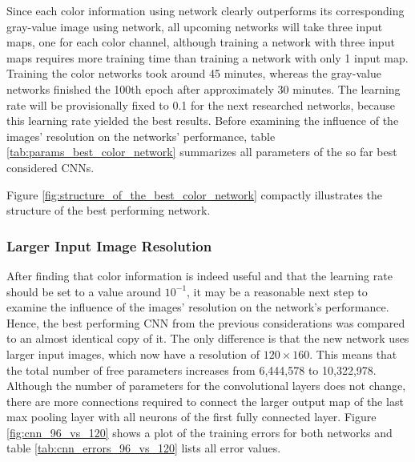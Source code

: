 \documentclass[11pt, a4paper]{article}
\begin{document}

Since each color information using network clearly outperforms its corresponding gray-value image using network, all upcoming networks will take three input maps, one for each color channel, although training a network with three input maps requires more training time than training a network with only 1 input map. Training the color networks took around 45 minutes, whereas the gray-value networks finished the 100th epoch after approximately 30 minutes. The learning rate will be provisionally fixed to 0.1 for the next researched networks, because this learning rate yielded the best results. Before examining the influence of the images' resolution on the networks' performance, table \ref{tab:params_best_color_network} summarizes all parameters of the so far best considered \acp{CNN}.



Figure \ref{fig:structure_of_the_best_color_network} compactly illustrates the structure of the best performing network.



\subsubsection{Larger Input Image Resolution}

After finding that color information is indeed useful and that the learning rate should be set to a value around $10^{-1}$, it may be a reasonable next step to examine the influence of the images' resolution on the network's performance. Hence, the best performing \ac{CNN} from the previous considerations was compared to an almost identical copy of it. The only difference is that the new network uses larger input images, which now have a resolution of $120\times160$. This means that the total number of free parameters increases from 6,444,578 to 10,322,978. Although the number of parameters for the convolutional layers does not change, there are more connections required to connect the larger output map of the last max pooling layer with all neurons of the first fully connected layer. Figure \ref{fig:cnn_96_vs_120} shows a plot of the training errors for both networks and table \ref{tab:cnn_errors_96_vs_120} lists all error values.
\end{document}
